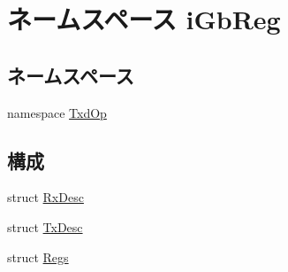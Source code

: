 \hypertarget{namespaceiGbReg}{
\section{ネームスペース iGbReg}
\label{namespaceiGbReg}
}
\subsection*{ネームスペース}
\begin{DoxyCompactItemize}
\item 
namespace \hyperlink{namespaceiGbReg_1_1TxdOp}{TxdOp}
\end{DoxyCompactItemize}
\subsection*{構成}
\begin{DoxyCompactItemize}
\item 
struct \hyperlink{structiGbReg_1_1RxDesc}{RxDesc}
\item 
struct \hyperlink{structiGbReg_1_1TxDesc}{TxDesc}
\item 
struct \hyperlink{structiGbReg_1_1Regs}{Regs}
\end{DoxyCompactItemize}
